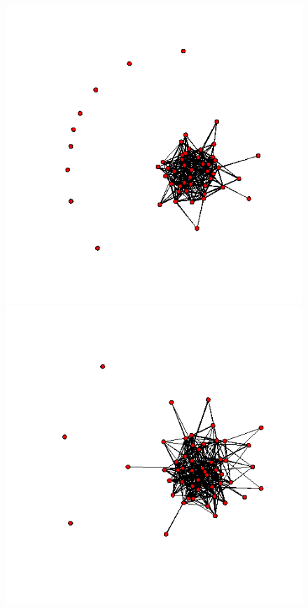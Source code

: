 \documentclass[aspectratio=169,ignorenonframetext,9pt]{beamer}
\theoremstyle{plain}
\theoremstyle{definition}
\begin{document}
\begin{figure}[h]
    \begin{center}
    \includegraphics[scale=0.23]{pictures/m2_19_nework.png}
    \includegraphics[scale=0.23]{pictures/w2_19_nework.png}

\end{center}
\end{figure}
\end{document}
